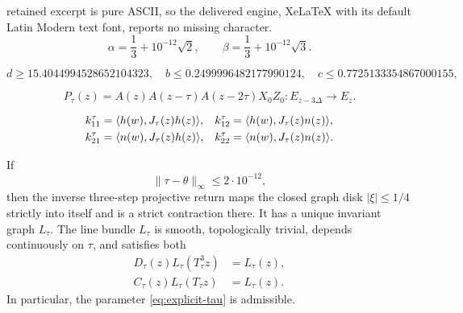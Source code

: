 \documentclass[10pt,a4paper]{amsart}
\begin{document}
retained excerpt is pure ASCII, so the delivered engine, XeLaTeX with its default Latin Modern text font, reports no missing character.
\begin{equation}\label{eq:explicit-tau}
 \alpha=\frac13+10^{-12}\sqrt2,
 \qquad
 \beta=\frac13+10^{-12}\sqrt3.
\end{equation}

\begin{equation}\label{eq:cert-numbers}
 d\ge 15.4044994528652104323,
 \quad
 b\le0.2499996482177990124,
 \quad
 c\le0.7725133354867000155,
\end{equation}

\begin{equation}\label{eq:Ptau}
 P_\tau(z)=A(z)A(z-\tau)A(z-2\tau)X_0Z_0:
 E_{z-3\Delta}\longrightarrow E_z.
\end{equation}

\begin{align}\label{eq:pert-k}
 k_{11}^\tau&=\langle h(w),J_\tau(z)h(z)\rangle,&
 k_{12}^\tau&=\langle h(w),J_\tau(z)n(z)\rangle,\notag\\
 k_{21}^\tau&=\langle n(w),J_\tau(z)h(z)\rangle,&
 k_{22}^\tau&=\langle n(w),J_\tau(z)n(z)\rangle.
\end{align}

\begin{proposition}\label{prop:explicit-square}
If
\begin{equation}\label{eq:explicit-square}
 \|\tau-\theta\|_\infty\le 2\cdot10^{-12},
\end{equation}
then the inverse three-step projective return maps the closed graph disk
$|\xi|\le1/4$ strictly into itself and is a strict contraction there.  It has
a unique invariant graph $L_\tau$.  The line bundle $L_\tau$ is smooth,
topologically trivial, depends continuously on $\tau$, and satisfies both
\begin{align}
 D_\tau(z)L_\tau(T_\tau^3z)&=L_\tau(z),                 \label{eq:three-inv}\\
 C_\tau(z)L_\tau(T_\tau z)&=L_\tau(z).                 \label{eq:one-inv}
\end{align}
In particular, the parameter \eqref{eq:explicit-tau} is admissible.
\end{proposition}
\end{document}
